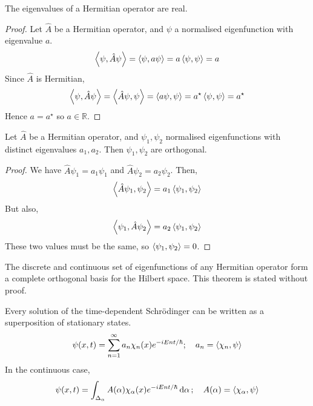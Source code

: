 \begin{theorem}
	The eigenvalues of a Hermitian operator are real.
\end{theorem}
\begin{proof}
	Let \( \hat A \) be a Hermitian operator, and \( \psi \) a normalised eigenfunction with eigenvalue \( a \).
	\[
		\left\langle{\psi, \hat A \psi}\right\rangle = \left\langle{\psi, a \psi}\right\rangle = a \left\langle{\psi, \psi}\right\rangle = a
	\]
	Since \( \hat A \) is Hermitian,
	\[
		\left\langle{\psi, \hat A \psi}\right\rangle = \left\langle{\hat A \psi, \psi}\right\rangle = \left\langle{a \psi, \psi}\right\rangle = a^\star \left\langle{\psi, \psi}\right\rangle = a^\star
	\]
	Hence \( a = a^\star \) so \( a \in \mathbb R \).
\end{proof}
\begin{theorem}
	Let \( \hat A \) be a Hermitian operator, and \( \psi_1, \psi_2 \) normalised eigenfunctions with distinct eigenvalues \( a_1, a_2 \).
	Then \( \psi_1, \psi_2 \) are orthogonal.
\end{theorem}
\begin{proof}
	We have \( \hat A \psi_1 = a_1 \psi_1 \) and \( \hat A \psi_2 = a_2 \psi_2 \).
	Then,
	\[
		\left\langle{\hat A \psi_1, \psi_2}\right\rangle = a_1 \left\langle{\psi_1, \psi_2}\right\rangle
	\]
	But also,
	\[
		\left\langle{\psi_1, \hat A \psi_2}\right\rangle = a_2 \left\langle{\psi_1, \psi_2}\right\rangle
	\]
	These two values must be the same, so \( \left\langle{\psi_1, \psi_2}\right\rangle = 0 \).
\end{proof}
\begin{theorem}
	The discrete and continuous set of eigenfunctions of any Hermitian operator form a complete orthogonal basis for the Hilbert space.
	This theorem is stated without proof.
\end{theorem}
\begin{corollary}
	Every solution of the time-dependent Schr\"odinger can be written as a superposition of stationary states.
	\[
		\psi(x, t) = \sum_{n=1}^\infty a_n \chi_n(x) e^{-iEnt/\hbar};\quad a_n = \left\langle{\chi_n, \psi}\right\rangle
	\]
	In the continuous case,
	\[
		\psi(x, t) = \int_{\Delta_\alpha} A(\alpha) \chi_\alpha(x) e^{-iEnt/\hbar} \dd{\alpha};\quad A(\alpha) = \left\langle{\chi_\alpha, \psi}\right\rangle
	\]
\end{corollary}

